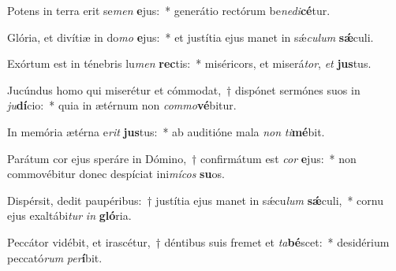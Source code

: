 \item Potens in terra erit se\textit{men} \textbf{e}jus:~* generátio rectórum be\textit{ne}\textit{di}\textbf{cé}tur.
\item Glória, et divítiæ in do\textit{mo} \textbf{e}jus:~* et justítia ejus manet in sǽ\textit{cu}\textit{lum} \textbf{sǽ}culi.
\item Exórtum est in ténebris lu\textit{men} \textbf{rec}tis:~* miséricors, et miserá\textit{tor}, \textit{et} \textbf{jus}tus.
\item Jucúndus homo qui miserétur et cómmodat,~† dispónet sermónes suos in \textit{ju}\textbf{dí}cio:~* quia in ætérnum non \textit{com}\textit{mo}\textbf{vé}bitur.
\item In memória ætérna e\textit{rit} \textbf{jus}tus:~* ab auditióne mala \textit{non} \textit{ti}\textbf{mé}bit.
\item Parátum cor ejus speráre in Dómino,~† confirmátum est \textit{cor} \textbf{e}jus:~* non commovébitur donec despíciat ini\textit{mí}\textit{cos} \textbf{su}os.
\item Dispérsit, dedit paupéribus:~† justítia ejus manet in sǽcu\textit{lum} \textbf{sǽ}culi,~* cornu ejus exaltábi\textit{tur} \textit{in} \textbf{gló}ria.
\item Peccátor vidébit, et irascétur,~† déntibus suis fremet et \textit{ta}\textbf{bé}scet:~* desidérium peccató\textit{rum} \textit{per}\textbf{í}bit.
